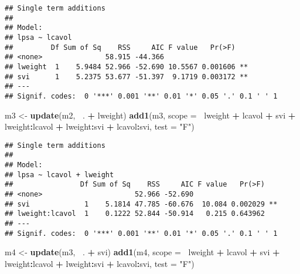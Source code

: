 \documentclass[12pt,dutch,coursenotes]{book}
\newenvironment{Shaded}{\begin{snugshade}}{\end{snugshade}}
\newcommand{\KeywordTok}[1]{\textcolor[rgb]{0.13,0.29,0.53}{\textbf{#1}}}
\newcommand{\DataTypeTok}[1]{\textcolor[rgb]{0.13,0.29,0.53}{#1}}
\newcommand{\StringTok}[1]{\textcolor[rgb]{0.31,0.60,0.02}{#1}}
\newcommand{\OperatorTok}[1]{\textcolor[rgb]{0.81,0.36,0.00}{\textbf{#1}}}
\newcommand{\NormalTok}[1]{#1}
\theoremstyle{definition}
\theoremstyle{definition}
\theoremstyle{definition}
\theoremstyle{remark}
\begin{document}
\begin{verbatim}
## Single term additions
## 
## Model:
## lpsa ~ lcavol
##         Df Sum of Sq    RSS     AIC F value   Pr(>F)   
## <none>               58.915 -44.366                    
## lweight  1    5.9484 52.966 -52.690 10.5567 0.001606 **
## svi      1    5.2375 53.677 -51.397  9.1719 0.003172 **
## ---
## Signif. codes:  0 '***' 0.001 '**' 0.01 '*' 0.05 '.' 0.1 ' ' 1
\end{verbatim}

\begin{Shaded}
\begin{Highlighting}[]
\NormalTok{m3 <-}\StringTok{ }\KeywordTok{update}\NormalTok{(m2, }\OperatorTok{~}\NormalTok{. }\OperatorTok{+}\StringTok{ }\NormalTok{lweight)}
\KeywordTok{add1}\NormalTok{(m3, }\DataTypeTok{scope =} \OperatorTok{~}\NormalTok{lweight }\OperatorTok{+}\StringTok{ }\NormalTok{lcavol }\OperatorTok{+}\StringTok{ }\NormalTok{svi }\OperatorTok{+}\StringTok{ }\NormalTok{lweight}\OperatorTok{:}\NormalTok{lcavol }\OperatorTok{+}\StringTok{ }
\StringTok{    }\NormalTok{lweight}\OperatorTok{:}\NormalTok{svi }\OperatorTok{+}\StringTok{ }\NormalTok{lcavol}\OperatorTok{:}\NormalTok{svi, }\DataTypeTok{test =} \StringTok{"F"}\NormalTok{)}
\end{Highlighting}
\end{Shaded}

\begin{verbatim}
## Single term additions
## 
## Model:
## lpsa ~ lcavol + lweight
##                Df Sum of Sq    RSS     AIC F value   Pr(>F)   
## <none>                      52.966 -52.690                    
## svi             1    5.1814 47.785 -60.676  10.084 0.002029 **
## lweight:lcavol  1    0.1222 52.844 -50.914   0.215 0.643962   
## ---
## Signif. codes:  0 '***' 0.001 '**' 0.01 '*' 0.05 '.' 0.1 ' ' 1
\end{verbatim}

\begin{Shaded}
\begin{Highlighting}[]
\NormalTok{m4 <-}\StringTok{ }\KeywordTok{update}\NormalTok{(m3, }\OperatorTok{~}\NormalTok{. }\OperatorTok{+}\StringTok{ }\NormalTok{svi)}
\KeywordTok{add1}\NormalTok{(m4, }\DataTypeTok{scope =} \OperatorTok{~}\NormalTok{lweight }\OperatorTok{+}\StringTok{ }\NormalTok{lcavol }\OperatorTok{+}\StringTok{ }\NormalTok{svi }\OperatorTok{+}\StringTok{ }\NormalTok{lweight}\OperatorTok{:}\NormalTok{lcavol }\OperatorTok{+}\StringTok{ }
\StringTok{    }\NormalTok{lweight}\OperatorTok{:}\NormalTok{svi }\OperatorTok{+}\StringTok{ }\NormalTok{lcavol}\OperatorTok{:}\NormalTok{svi, }\DataTypeTok{test =} \StringTok{"F"}\NormalTok{)}
\end{Highlighting}
\end{Shaded}
\end{document}
